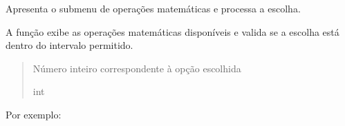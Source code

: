 \documentclass[letterpaper,10pt,portuges]{sphinxmanual}
\begin{document}
\begin{fulllineitems}
\label{\detokenize{main:main.menu_matematica}}
\pysigstartsignatures
\pysiglinewithargsret
{}
{}
{}
\pysigstopsignatures
\sphinxAtStartPar
Apresenta o submenu de operações matemáticas e processa a escolha.

\sphinxAtStartPar
A função exibe as operações matemáticas disponíveis e valida se
a escolha está dentro do intervalo permitido.
\begin{quote}\begin{description}
\sphinxAtStartPar
Número inteiro correspondente à opção escolhida

\sphinxAtStartPar
int

\end{description}\end{quote}

\sphinxAtStartPar
Por exemplo:

\begin{sphinxVerbatim}[commandchars=\\\{\}]
\end{sphinxVerbatim}

\end{fulllineitems}

\end{document}
